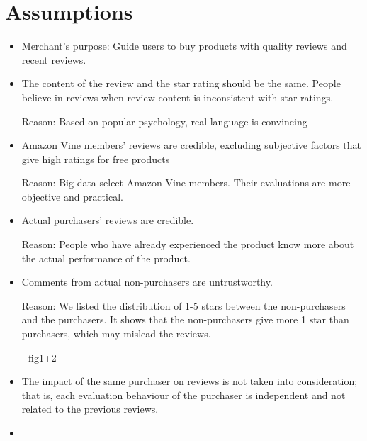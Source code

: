 \documentclass{mcmthesis}
\begin{document}
\section{Assumptions}
\begin{itemize}
  \item Merchant's purpose: Guide users to buy products with quality reviews and recent reviews.
\end{itemize}
\begin{itemize}
  \item The content of the review and the star rating should be the same. People believe in reviews when review content is inconsistent with star ratings.

Reason: Based on popular psychology, real language is convincing 
\end{itemize}
\begin{itemize}
  \item Amazon Vine members' reviews are credible, excluding subjective factors that give high ratings for free products

Reason: Big data select Amazon Vine members. Their evaluations are more objective and practical.
\end{itemize}
\begin{itemize}
  \item Actual purchasers' reviews are credible.

Reason: People who have already experienced the product know more about the actual performance of the product.
\end{itemize}
\begin{itemize}
  \item Comments from actual non-purchasers are untrustworthy.

Reason: We listed the distribution of 1-5 stars between the non-purchasers and the purchasers. It shows that the non-purchasers give more 1 star than purchasers, which may mislead the reviews.

- fig1+2
\end{itemize}
\begin{itemize}
  \item The impact of the same purchaser on reviews is not taken into consideration; that is, each evaluation behaviour of the purchaser is independent and not related to the previous reviews.
\end{itemize}
\begin{itemize}
  \item 
\end{itemize}
\end{document}

